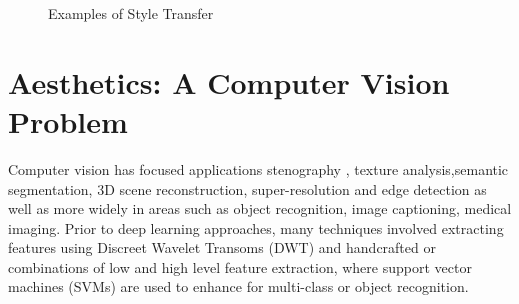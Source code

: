 \begin{figure}[ht!]
    \centering
    \hfill
    \hfill
    \hfill
    \label{fig:style transfer}
    \caption{Examples of Style Transfer}
    
\end{figure}


\newpage


\section{Aesthetics: A Computer Vision Problem}

Computer vision has focused applications stenography \cite{Das2021}, texture analysis,semantic segmentation\cite{Shelhamer2017}, 3D scene reconstruction\cite{Murez2020}, super-resolution\cite{Liang2021} and edge detection\cite{Poma2021} as well as more widely in areas such as object recognition, image captioning, medical imaging. Prior to deep learning  approaches, many techniques involved extracting features using Discreet Wavelet Transoms (DWT)\cite{Makbol2013, Goel2019, Kanwal2021, Goel2014} and  handcrafted or combinations of low and high level feature extraction, where support vector machines (SVMs) are used to enhance for multi-class or object recognition\cite{Makili2011,Goos2016}. 

